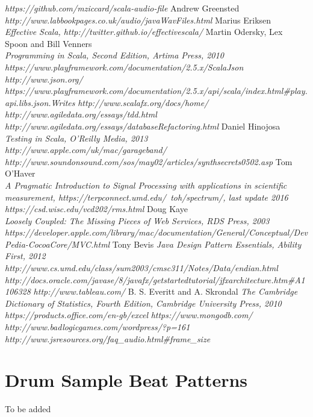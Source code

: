 \documentclass[a4paper, 11pt]{article}
\begin{document}
\begin{thebibliography}{99}
\textit{https://github.com/mziccard/scala-audio-file}
Andrew Greensted
\textit{http://www.labbookpages.co.uk/audio/javaWavFiles.html}
Marius Eriksen\\
\textit{Effective Scala, http://twitter.github.io/effectivescala/}
Martin Odersky, Lex Spoon and Bill Venners\\
\textit{Programming in Scala, Second Edition, Artima Press, 2010}
\textit{https://www.playframework.com/documentation/2.5.x/ScalaJson}
\textit{http://www.json.org/}
\textit{https://www.playframework.com/documentation/2.5.x/api/scala/index.html\#play.api.libs.json.Writes}
\textit{http://www.scalafx.org/docs/home/}
\textit{http://www.agiledata.org/essays/tdd.html}
\textit{http://www.agiledata.org/essays/databaseRefactoring.html}
Daniel Hinojosa\\
\textit{Testing in Scala, O’Reilly Media, 2013}
\textit{http://www.apple.com/uk/mac/garageband/}
\textit{http://www.soundonsound.com/sos/may02/articles/synthsecrets0502.asp}
Tom O'Haver\\
\textit{A Pragmatic Introduction to Signal Processing with applications in scientific measurement, https://terpconnect.umd.edu/~toh/spectrum/, last update 2016}
\textit{https://csd.wisc.edu/vcd202/rms.html}
Doug Kaye\\
\textit{Loosely Coupled: The Missing Pieces of Web Services, RDS Press, 2003}
\textit{https://developer.apple.com/library/mac/documentation/General/Conceptual/DevPedia-CocoaCore/MVC.html}
Tony Bevis
\textit{Java Design Pattern Essentials, Ability First, 2012}
\textit{http://www.cs.umd.edu/class/sum2003/cmsc311/Notes/Data/endian.html}
\textit{http://docs.oracle.com/javase/8/javafx/get\-started\-tutorial/jfx\-architecture.htm\#A1106328}
\textit{http://www.tableau.com/}
B. S. Everitt and A. Skrondal
\textit{The Cambridge Dictionary of Statistics, Fourth Edition, Cambridge University Press, 2010}
\textit{https://products.office.com/en-gb/excel}
\textit{https://www.mongodb.com/}
\textit{http://www.badlogicgames.com/wordpress/?p=161}
\textit{http://www.jsresources.org/faq\_audio.html\#frame\_size}
\end{thebibliography}

\newpage

\appendix
\section{Drum Sample Beat Patterns}
To be added
\end{document}
